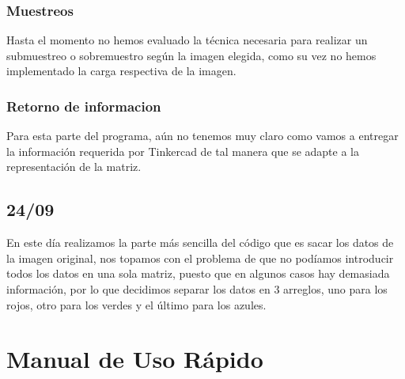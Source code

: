 \documentclass{article}
\begin{document}
    \begin{flushleft}
    \subsubsection{Muestreos}
    Hasta el momento no hemos evaluado la técnica necesaria para realizar un submuestreo o sobremuestro según la imagen elegida, como su vez no hemos implementado la carga respectiva de la imagen.  
    \end{flushleft}
    
    \begin{flushleft}
    \subsubsection{Retorno de informacion}
    Para esta parte del programa, aún no tenemos muy claro como vamos a entregar la información requerida por Tinkercad de tal manera que se adapte a la representación de la matriz.  
    \end{flushleft}
    
    \begin{flushleft}
     \subsection{24/09}
     En este día realizamos la parte más sencilla del código que es sacar los datos de la imagen original, nos topamos con el problema de que no podíamos introducir todos los datos en una sola matriz, puesto que en algunos casos hay demasiada información, por lo que decidimos separar los datos en 3 arreglos, uno para los rojos, otro para los verdes y el último para los azules.
    \end{flushleft}
    
\section{Manual de Uso Rápido}
\label{manual}
    \begin{flushleft}
        
    \end{flushleft}

\vfill

\end{document}
